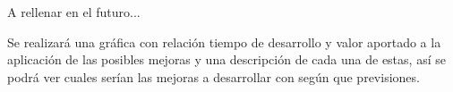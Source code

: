 A rellenar en el futuro...

Se realizará una gráfica con relación tiempo de desarrollo y valor aportado a la aplicación de las posibles mejoras y una descripción de cada una de estas, así se podrá ver cuales serían las mejoras a desarrollar con según que previsiones.